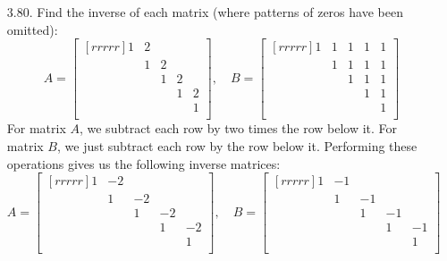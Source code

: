 \documentclass[12pt]{article}
\begin{document}
\begin{enumerate}
\item [3.80.] Find the inverse of each matrix (where patterns of zeros have been omitted):
	\[ 	A= \begin{bmatrix}[rrrrr] 	1  & 2  & {} & {} & {}\\
									{} & 1  & 2  & {} & {}\\
									{} & {} & 1  & 2  & {}\\
									{} & {} & {} & 1  & 2 \\
									{} & {} & {} & {} & 1\\ \end{bmatrix}, \quad
		B= \begin{bmatrix}[rrrrr]	1  & 1  & 1  & 1  & 1\\
									{} & 1  & 1  & 1  & 1\\
									{} & {} & 1  & 1  & 1\\
									{} & {} & {} & 1  & 1\\
									{} & {} & {} & {} & 1\\ \end{bmatrix} \]
	For matrix $A$, we subtract each row by two times the row below it. For matrix $B$, we just subtract each row by the row below it. Performing these operations gives us the following inverse matrices:
	\[ 	A= \begin{bmatrix}[rrrrr] 	1  & -2  & {} & {} & {}\\
									{} & 1  & -2  & {} & {}\\
									{} & {} & 1  & -2  & {}\\
									{} & {} & {} & 1  & -2 \\
									{} & {} & {} & {} & 1\\ \end{bmatrix}, \quad
		B= \begin{bmatrix}[rrrrr]	1  & -1  & {}  & {}  & {}\\
									{} & 1  & -1  & {}  & {}\\
									{} & {} & 1  & -1  & {}\\
									{} & {} & {} & 1  & -1\\
									{} & {} & {} & {} & 1\\ \end{bmatrix} \]



\end{enumerate}
\end{document}
